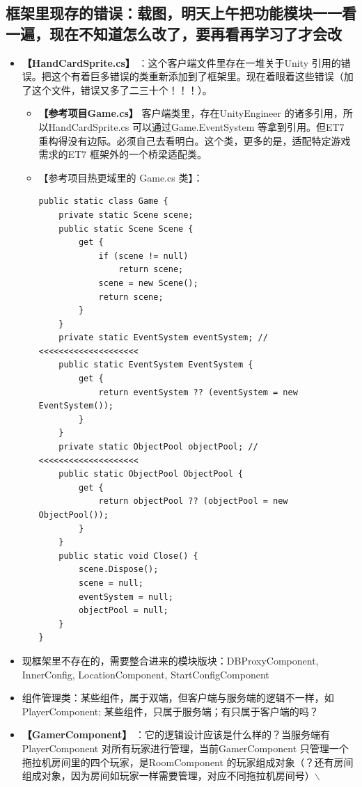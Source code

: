 \documentclass[9pt, b5paper]{article}
\begin{document}
\subsection{框架里现存的错误：载图，明天上午把功能模块一一看一遍，现在不知道怎么改了，要再看再学习了才会改}
\label{sec:orgdcb5406}
\begin{itemize}
\item \textbf{【HandCardSprite.cs】} ：这个客户端文件里存在一堆关于Unity 引用的错误。把这个有着巨多错误的类重新添加到了框架里。现在着眼着这些错误（加了这个文件，错误又多了二三十个！！！）。
\begin{itemize}
\item \textbf{【参考项目Game.cs】} 客户端类里，存在UnityEngineer 的诸多引用，所以HandCardSprite.cs 可以通过Game.EventSystem 等拿到引用。但ET7 重构得没有边际。必须自己去看明白。这个类，更多的是，适配特定游戏需求的ET7 框架外的一个桥梁适配类。
\item 【参考项目热更域里的 Game.cs 类】：
\begin{verbatim}
public static class Game {
    private static Scene scene;
    public static Scene Scene {
        get {
            if (scene != null) 
                return scene;
            scene = new Scene();
            return scene;
        }
    }
    private static EventSystem eventSystem; // <<<<<<<<<<<<<<<<<<<< 
    public static EventSystem EventSystem {
        get {
            return eventSystem ?? (eventSystem = new EventSystem());
        }
    }
    private static ObjectPool objectPool; // <<<<<<<<<<<<<<<<<<<< 
    public static ObjectPool ObjectPool {
        get {
            return objectPool ?? (objectPool = new ObjectPool());
        }
    }
    public static void Close() {
        scene.Dispose();
        scene = null;
        eventSystem = null;
        objectPool = null;
    }
}
\end{verbatim}
\end{itemize}
\item 现框架里不存在的，需要整合进来的模块版块：DBProxyComponent, InnerConfig, LocationComponent, StartConfigComponent
\item 组件管理类：某些组件，属于双端，但客户端与服务端的逻辑不一样，如PlayerComponent; 某些组件，只属于服务端；有只属于客户端的吗？
\item \textbf{【GamerComponent】} ：它的逻辑设计应该是什么样的？当服务端有 PlayerComponent 对所有玩家进行管理，当前GamerComponent 只管理一个拖拉机房间里的四个玩家，是RoomComponent 的玩家组成对象（？还有房间组成对象，因为房间如玩家一样需要管理，对应不同拖拉机房间号）$\backslash$

\end{itemize}
\end{document}
